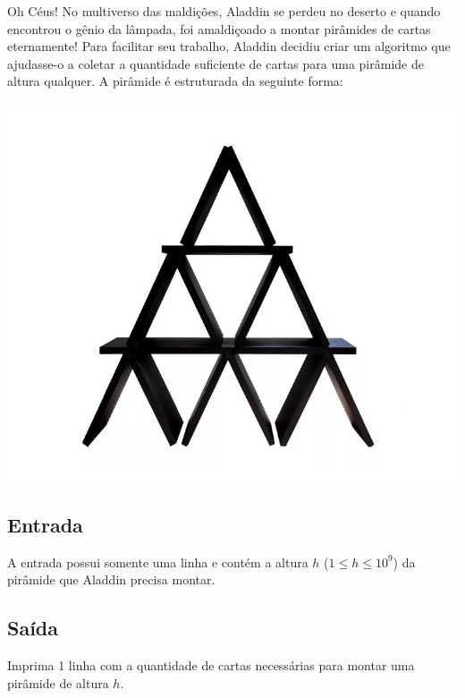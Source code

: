 Oh Céus! No multiverso das maldições, Aladdin se perdeu no deserto e quando encontrou o gênio da lâmpada, foi amaldiçoado a montar pirâmides de cartas eternamente! Para facilitar seu trabalho, Aladdin decidiu criar um algoritmo que ajudasse-o a coletar a quantidade suficiente de cartas para uma pirâmide de altura qualquer. A pirâmide é estruturada da seguinte forma:

\begin{center}
    \includegraphics[scale=0.4]{lampada/piramide.png}
\end{center}

\subsection*{Entrada}
A entrada possui somente uma linha e contém a altura $h$ ($1 \leq h \leq 10^9$) da pirâmide que Aladdin precisa montar.

\subsection*{Saída}
Imprima 1 linha com a quantidade de cartas necessárias para montar uma pirâmide de altura $h$.

